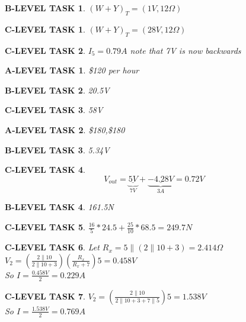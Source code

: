 \documentclass{book}
\numberwithin{equation}{section}
\newtheorem{alevel}{A-LEVEL TASK}
\newtheorem{blevel}{B-LEVEL TASK}
\newtheorem{clevel}{C-LEVEL TASK}
\theoremstyle{definition}
\begin{document}
\begin{blevel}$(W+Y)_T=(1V,12\Omega)$\end{blevel}
\begin{clevel}$(W+Y)_T=(28V,12\Omega)$\end{clevel}
\begin{clevel}$I_5=0.79A$ note that 7V is now backwards\end{clevel}
\begin{alevel}\$120 per hour\end{alevel}
\begin{blevel}20.5V\end{blevel}
\begin{clevel}58V\end{clevel}
\begin{alevel}\$180,\$180\end{alevel}
\begin{blevel}5.34V\end{blevel}
\begin{clevel}
\[
V_{out}=\underbrace{\underline{5V}}_{7V}+\underbrace{\underline{-4.28V}}_{3A} = 0.72V
\]
\end{clevel}

\begin{blevel}161.5N\end{blevel}
\begin{clevel}$\frac{16}{5}*24.5+\frac{25}{10}*68.5=249.7N$\end{clevel}

\begin{clevel} Let $R_x=5\parallel(2\parallel 10 +3) = 2.414\Omega$\\
$V_2=(\frac{2\parallel 10}{2\parallel 10 + 3})(\frac{R_x}{R_x+7})5=0.458V$\\
So $I=\frac{0.458V}{2}=0.229A$
\end{clevel}
\begin{clevel}
$V_2=(\frac{2\parallel 10}{2\parallel 10 + 3+7\parallel 5})5=1.538V$\\
So $I=\frac{1.538V}{2}=0.769A$
\end{clevel}

\setcounter{alevel}{0} \setcounter{blevel}{0} \setcounter{clevel}{0} \setcounter{dlevel}{0}
\end{document}
